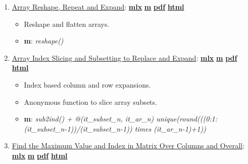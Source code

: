 \documentclass[
]{book}
\providecommand{\tightlist}{%
  \setlength{\itemsep}{0pt}\setlength{\parskip}{0pt}}
\begin{document}
\begin{enumerate}
\def\labelenumi{\arabic{enumi}.}
\tightlist
\item
  \href{https://fanwangecon.github.io/M4Econ/amto/array/htmlpdfm/fs_reshape.html}{Array Reshape, Repeat and Expand}: \href{https://github.com/FanWangEcon/M4Econ/blob/master/amto/array/fs_reshape.mlx}{\textbf{mlx}} \textbar{} \href{https://github.com/FanWangEcon/M4Econ/blob/master/amto/array/htmlpdfm/fs_reshape.m}{\textbf{m}} \textbar{} \href{https://github.com/FanWangEcon/M4Econ/blob/master/amto/array/htmlpdfm/fs_reshape.pdf}{\textbf{pdf}} \textbar{} \href{https://fanwangecon.github.io/M4Econ/amto/array/htmlpdfm/fs_reshape.html}{\textbf{html}}

  \begin{itemize}
  \tightlist
  \item
    Reshape and flatten arrays.
  \item
    \textbf{m}: \emph{reshape()}
  \end{itemize}
\item
  \href{https://fanwangecon.github.io/M4Econ/amto/array/htmlpdfm/fs_slicing.html}{Array Index Slicing and Subsetting to Replace and Expand}: \href{https://github.com/FanWangEcon/M4Econ/blob/master/amto/array/fs_slicing.mlx}{\textbf{mlx}} \textbar{} \href{https://github.com/FanWangEcon/M4Econ/blob/master/amto/array/htmlpdfm/fs_slicing.m}{\textbf{m}} \textbar{} \href{https://github.com/FanWangEcon/M4Econ/blob/master/amto/array/htmlpdfm/fs_slicing.pdf}{\textbf{pdf}} \textbar{} \href{https://fanwangecon.github.io/M4Econ/amto/array/htmlpdfm/fs_slicing.html}{\textbf{html}}

  \begin{itemize}
  \tightlist
  \item
    Index based column and row expansions.
  \item
    Anonymous function to slice array subsets.
  \item
    \textbf{m}: \emph{sub2ind() + @(it\_subset\_n, it\_ar\_n) unique(round(((0:1:(it\_subset\_n-1))/(it\_subset\_n-1)) times (it\_ar\_n-1)+1))}
  \end{itemize}
\item
  \href{https://fanwangecon.github.io/M4Econ/amto/array/htmlpdfm/fs_matrix_max.html}{Find the Maximum Value and Index in Matrix Over Columns and Overall}: \href{https://github.com/FanWangEcon/M4Econ/blob/master/amto/array/fs_matrix_max.mlx}{\textbf{mlx}} \textbar{} \href{https://github.com/FanWangEcon/M4Econ/blob/master/amto/array/htmlpdfm/fs_matrix_max.m}{\textbf{m}} \textbar{} \href{https://github.com/FanWangEcon/M4Econ/blob/master/amto/array/htmlpdfm/fs_matrix_max.pdf}{\textbf{pdf}} \textbar{} \href{https://fanwangecon.github.io/M4Econ/amto/array/htmlpdfm/fs_matrix_max.html}{\textbf{html}}


\end{enumerate}
\end{document}
